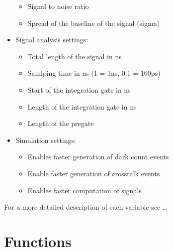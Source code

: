 \documentclass[letterpaper,10pt,english]{sphinxmanual}
\begin{document}
\begin{itemize}
\begin{itemize}
\item {} 
 Signal to noise ratio

\item {} 
 Spread of the baseline of the signal (sigma)

\end{itemize}

\item {} 
Signal analysis settings:
\begin{itemize}
\item {} 
 Total length of the signal in ns

\item {} 
 Samlping time in ns (1 = 1ns, 0.1 = 100ps)

\item {} 
 Start of the integration gate in ns

\item {} 
 Length of the integration gate in ns

\item {} 
 Length of the pregate

\end{itemize}

\item {} 
Simulation settings:
\begin{itemize}
\item {} 
 Enables faster generation of dark count events

\item {} 
  Enable faster generation of crosstalk events

\item {} 
  Enables faster computation of signals

\end{itemize}

\end{itemize}

For a more detailed description of each variable see …


\section{Functions}
\label{\detokenize{structure:functions}}
\end{document}
